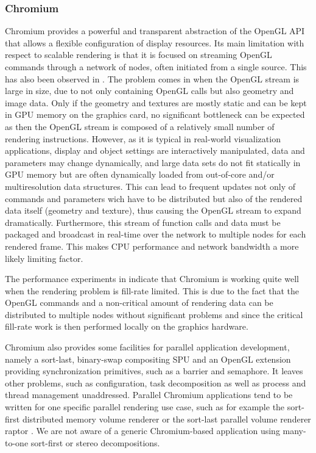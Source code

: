 \subsubsection{Chromium}

Chromium \cite{HHNFAKK:02} provides a powerful and transparent abstraction of
the OpenGL API that allows a flexible configuration of display resources. Its
main limitation with respect to scalable rendering is that it is focused on
streaming OpenGL commands through a network of nodes, often initiated from a
single source. This has also been observed in \cite{SWNH:03}. The problem comes
in when the OpenGL stream is large in size, due to not only containing OpenGL
calls but also geometry and image data. Only if the geometry and textures are
mostly static and can be kept in GPU memory on the graphics card, no
significant bottleneck can be expected as then the OpenGL stream is composed of
a relatively small number of rendering instructions. However, as it is typical
in real-world visualization applications, display and object settings are
interactively manipulated, data and parameters may change dynamically, and
large data sets do not fit statically in GPU memory but are often dynamically
loaded from out-of-core and/or multiresolution data structures. This can lead
to frequent updates not only of commands and parameters wich have to be
distributed but also of the rendered data itself (geometry and texture), thus
causing the OpenGL stream to expand dramatically. Furthermore, this stream of
function calls and data must be packaged and broadcast in real-time over the
network to multiple nodes for each rendered frame. This makes CPU performance
and network bandwidth a more likely limiting factor.

The performance experiments in \cite{HHNFAKK:02} indicate that Chromium is
working quite well when the rendering problem is fill-rate limited. This is due
to the fact that the OpenGL commands and a non-critical amount of rendering data
can be distributed to multiple nodes without significant problems and since the
critical fill-rate work is then performed locally on the graphics hardware.

Chromium also provides some facilities for parallel application development,
namely a sort-last, binary-swap compositing SPU and an OpenGL extension
providing synchronization primitives, such as a barrier and semaphore. It leaves
other problems, such as configuration, task decomposition as well as process and
thread management unaddressed. Parallel Chromium applications tend to be written
for one specific parallel rendering use case, such as for example the sort-first
distributed memory volume renderer \cite{BHPB:03} or the sort-last parallel
volume renderer raptor \cite{Raptor}. We are not aware of a generic
Chromium-based application using many-to-one sort-first or stereo
decompositions.

